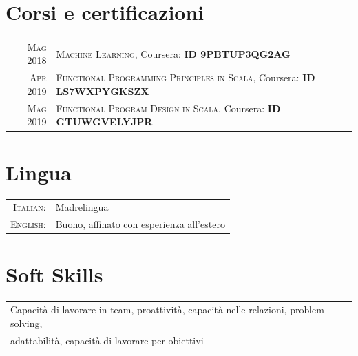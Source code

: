 \documentclass[a4paper,10pt]{article} %
\begin{document}

\section{Corsi e certificazioni}

\begin{tabular}{rl}
\textsc{Mag} 2018 & \textsc{Machine Learning},  Coursera: \textbf{ID 9PBTUP3QG2AG}\\
\textsc{Apr} 2019 & \textsc{Functional Programming Principles in Scala},  Coursera: \textbf{ID LS7WXPYGKSZX}\\
\textsc{Mag} 2019 & \textsc{Functional Program Design in Scala},  Coursera: \textbf{ID GTUWGVELYJPR}
\end{tabular}


\section{Lingua}

\begin{tabular}{rl}
\textsc{Italian:} & Madrelingua\\
\textsc{English:} & Buono, affinato con esperienza all'estero
\end{tabular}


\section{Soft Skills}

\begin{tabular}{lr}
Capacità di lavorare in team, proattività, capacità nelle relazioni, problem solving, \\
adattabilità, capacità di lavorare per obiettivi
\end{tabular}

\end{document}
